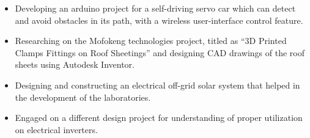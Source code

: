 \documentclass[10pt,a4paper,ragged2e]{altacv}
\begin{document}
\begin{itemize}

\item Developing an arduino project for a self-driving servo car which can detect and avoid obstacles in its path, with a wireless user-interface %
control feature.

\item Researching on the Mofokeng technologies project, titled as ``3D Printed Clamps Fittings on Roof Sheetings'' and designing CAD drawings of the roof sheets using Autodesk Inventor.

\end{itemize}


\divider



\begin{itemize}
\item Designing and constructing an electrical off-grid solar system that helped in the development of the laboratories.
\item Engaged on a different design project for understanding of proper utilization on electrical inverters.
\end{itemize}


\end{document}
